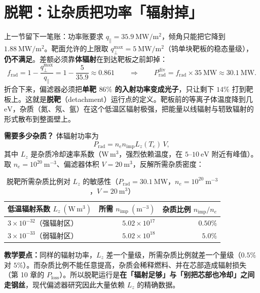 \section{脱靶：让杂质把功率「辐射掉」}

上一节留下一笔账：功率账要求 $q_\parallel=35.9\ \mathrm{MW/m^2}$，倾角只能把它降到 $1.88\ \mathrm{MW/m^2}$。靶面允许的上限取 $q_\perp^{\max}=5\ \mathrm{MW/m^2}$（钨单块靶板的稳态量级），\textbf{仍不满足}。差额必须靠\textbf{体辐射}在到达靶板之前卸掉：
\begin{equation}
f_{\mathrm{rad}}=1-\frac{q_\perp^{\max}}{q_\parallel}=1-\frac{5}{35.9}\approx0.861
\qquad\Longrightarrow\qquad
P_{\mathrm{rad}}^{\mathrm{div}}=f_{\mathrm{rad}}\times35\ \mathrm{MW}\approx30.1\ \mathrm{MW}.
\label{eq:app-n-frad}
\end{equation}
折合下来，偏滤器必须把\textbf{单靶 $86\%$ 的入射功率变成光子}，只让剩下 $14\%$ 打到靶板上。这就是\textbf{脱靶}（detachment）运行点的定义。靶板前的等离子体温度降到几 $\mathrm{eV}$，杂质（氮、氖、氩）在这个低温区辐射极强，把能量以线辐射与轫致辐射的形式散布到整面壁上。

\textbf{需要多少杂质？} 体辐射功率为
\begin{equation}
P_{\mathrm{rad}}=n_en_{\mathrm{imp}}L_z(T_e)\,V,
\label{eq:app-n-lz}
\end{equation}
其中 $L_z$ 是杂质冷却速率系数（$\mathrm{W\,m^3}$，强烈依赖温度，在 $5$--$10\ \mathrm{eV}$ 附近有峰值）。取 $n_e=10^{20}\ \mathrm{m^{-3}}$、偏滤器体积 $V=20\ \mathrm{m^3}$，反解所需杂质密度：
\begin{table}[htbp]
\centering
\small
\caption{脱靶所需杂质比例对 $L_z$ 的敏感性（$P_{\mathrm{rad}}=30.1\ \mathrm{MW}$，$n_e=10^{20}\ \mathrm{m^{-3}}$，$V=20\ \mathrm{m^3}$）}
\label{tab:app-n-impurity}
\begin{tabular}{@{}lrr@{}}
\toprule
低温辐射系数 $L_z\ (\mathrm{W\,m^3})$ & 所需 $n_{\mathrm{imp}}\ (\mathrm{m^{-3}})$ & 杂质比例 $n_{\mathrm{imp}}/n_e$ \\
\midrule
$3\times10^{-32}$（强辐射区） & $5.02\times10^{17}$ & $0.50\%$ \\
$3\times10^{-33}$（弱辐射区） & $5.02\times10^{18}$ & $5.0\%$ \\
\bottomrule
\end{tabular}
\end{table}
\textbf{教学要点：}同样的辐射功率，$L_z$ 差一个量级，所需杂质比例就差一个量级（$0.5\%$ 对 $5\%$）。而杂质比例不能任意提高，杂质会稀释燃料、并在芯部造成辐射损失（第 10 章的 $P_{\mathrm{loss}}$）。所以脱靶运行是\textbf{在「辐射足够」与「别把芯部也冷却」之间走钢丝}，现代偏滤器研究因此大量依赖 $L_z$ 的精确数据。

